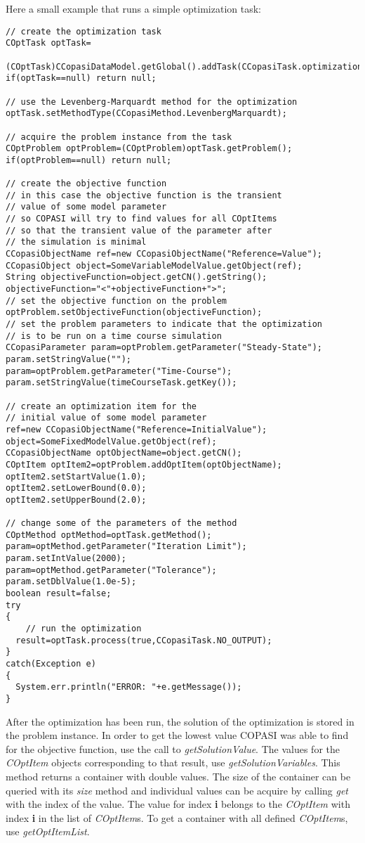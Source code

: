 \documentclass[a4,10pt]{article}
\begin{document}
Here a small example that runs a simple optimization task:

\begin{lstlisting}
// create the optimization task
COptTask optTask=
  (COptTask)CCopasiDataModel.getGlobal().addTask(CCopasiTask.optimization);
if(optTask==null) return null;

// use the Levenberg-Marquardt method for the optimization
optTask.setMethodType(CCopasiMethod.LevenbergMarquardt);

// acquire the problem instance from the task
COptProblem optProblem=(COptProblem)optTask.getProblem();
if(optProblem==null) return null;

// create the objective function
// in this case the objective function is the transient
// value of some model parameter
// so COPASI will try to find values for all COptItems
// so that the transient value of the parameter after
// the simulation is minimal
CCopasiObjectName ref=new CCopasiObjectName("Reference=Value");
CCopasiObject object=SomeVariableModelValue.getObject(ref);
String objectiveFunction=object.getCN().getString();
objectiveFunction="<"+objectiveFunction+">";
// set the objective function on the problem
optProblem.setObjectiveFunction(objectiveFunction);
// set the problem parameters to indicate that the optimization
// is to be run on a time course simulation
CCopasiParameter param=optProblem.getParameter("Steady-State");
param.setStringValue("");
param=optProblem.getParameter("Time-Course");
param.setStringValue(timeCourseTask.getKey());

// create an optimization item for the 
// initial value of some model parameter
ref=new CCopasiObjectName("Reference=InitialValue");
object=SomeFixedModelValue.getObject(ref);
CCopasiObjectName optObjectName=object.getCN();
COptItem optItem2=optProblem.addOptItem(optObjectName);
optItem2.setStartValue(1.0);
optItem2.setLowerBound(0.0);
optItem2.setUpperBound(2.0);

// change some of the parameters of the method
COptMethod optMethod=optTask.getMethod();
param=optMethod.getParameter("Iteration Limit");
param.setIntValue(2000);
param=optMethod.getParameter("Tolerance");
param.setDblValue(1.0e-5);
boolean result=false;
try
{
    // run the optimization
  result=optTask.process(true,CCopasiTask.NO_OUTPUT);
}
catch(Exception e)
{
  System.err.println("ERROR: "+e.getMessage());
}
\end{lstlisting}

After the optimization has been run, the solution of the optimization is stored in the problem instance.
In order to get the lowest value COPASI was able to find for the objective function, use the call to \textit{getSolutionValue}.
The values for the \textit{COptItem} objects corresponding to that result, use \textit{getSolutionVariables}. This method returns a container with double values. The size of the container can be queried with its \textit{size} method and individual values can be acquire by calling \textit{get} with the index of the value. The value for index \textbf{i} belongs to the \textit{COptItem} with index \textbf{i} in the list of \textit{COptItem}s.  To get a container with all defined \textit{COptItem}s, use \textit{getOptItemList}.
\end{document}
